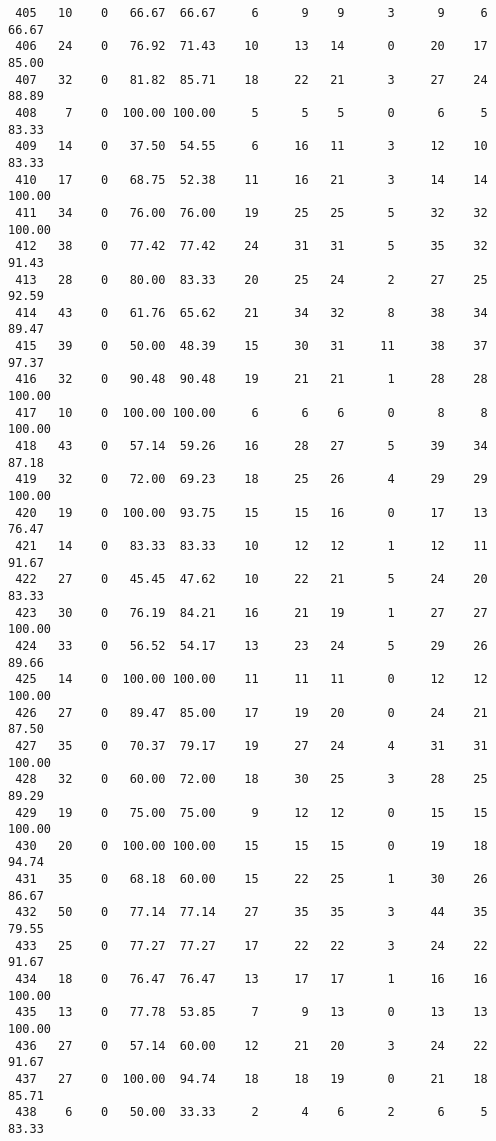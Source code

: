 \begin{verbatim}
 405   10    0   66.67  66.67     6      9    9      3      9     6    66.67
 406   24    0   76.92  71.43    10     13   14      0     20    17    85.00
 407   32    0   81.82  85.71    18     22   21      3     27    24    88.89
 408    7    0  100.00 100.00     5      5    5      0      6     5    83.33
 409   14    0   37.50  54.55     6     16   11      3     12    10    83.33
 410   17    0   68.75  52.38    11     16   21      3     14    14   100.00
 411   34    0   76.00  76.00    19     25   25      5     32    32   100.00
 412   38    0   77.42  77.42    24     31   31      5     35    32    91.43
 413   28    0   80.00  83.33    20     25   24      2     27    25    92.59
 414   43    0   61.76  65.62    21     34   32      8     38    34    89.47
 415   39    0   50.00  48.39    15     30   31     11     38    37    97.37
 416   32    0   90.48  90.48    19     21   21      1     28    28   100.00
 417   10    0  100.00 100.00     6      6    6      0      8     8   100.00
 418   43    0   57.14  59.26    16     28   27      5     39    34    87.18
 419   32    0   72.00  69.23    18     25   26      4     29    29   100.00
 420   19    0  100.00  93.75    15     15   16      0     17    13    76.47
 421   14    0   83.33  83.33    10     12   12      1     12    11    91.67
 422   27    0   45.45  47.62    10     22   21      5     24    20    83.33
 423   30    0   76.19  84.21    16     21   19      1     27    27   100.00
 424   33    0   56.52  54.17    13     23   24      5     29    26    89.66
 425   14    0  100.00 100.00    11     11   11      0     12    12   100.00
 426   27    0   89.47  85.00    17     19   20      0     24    21    87.50
 427   35    0   70.37  79.17    19     27   24      4     31    31   100.00
 428   32    0   60.00  72.00    18     30   25      3     28    25    89.29
 429   19    0   75.00  75.00     9     12   12      0     15    15   100.00
 430   20    0  100.00 100.00    15     15   15      0     19    18    94.74
 431   35    0   68.18  60.00    15     22   25      1     30    26    86.67
 432   50    0   77.14  77.14    27     35   35      3     44    35    79.55
 433   25    0   77.27  77.27    17     22   22      3     24    22    91.67
 434   18    0   76.47  76.47    13     17   17      1     16    16   100.00
 435   13    0   77.78  53.85     7      9   13      0     13    13   100.00
 436   27    0   57.14  60.00    12     21   20      3     24    22    91.67
 437   27    0  100.00  94.74    18     18   19      0     21    18    85.71
 438    6    0   50.00  33.33     2      4    6      2      6     5    83.33

\end{verbatim}
